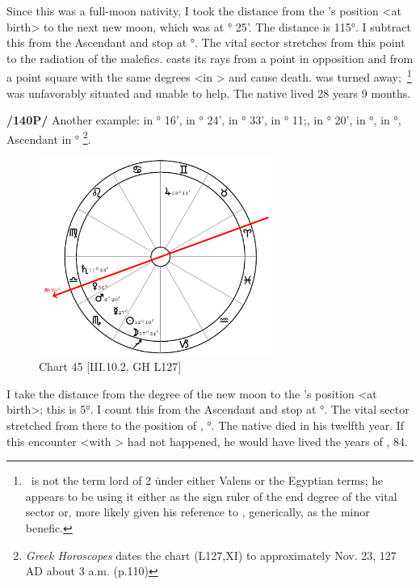 Since this was a full-moon nativity, I took the distance from the \Moon’s position <at birth> to the next new moon, which was at \Gemini\xspace 2° 25'. The distance is 115°. I subtract this from the Ascendant and stop at \Libra\xspace 2°. The vital sector stretches from this point to the radiation of the malefics. \Saturn\xspace casts its rays from a point in opposition and \Mars\xspace from a point square with the same degrees <in \Libra> and cause death. \Jupiter\xspace was turned away; \Venus\,\footnote{\Venus\, is not the term lord of 2 \Libra\. under either Valens or the Egyptian terms; he appears to be using it either as the sign ruler of the end degree of the vital sector or, more likely given his reference to \Jupiter, generically, as the minor benefic.} was unfavorably situated and unable to help. The native lived 28 years 9 months.

\newpage
\textbf{/140P/} Another example: \Sun\xspace in \Sagittarius\xspace 12° 16', \Moon\xspace in \Sagittarius\xspace 17° 24', \Saturn\xspace in \Libra\xspace 11° 33', \Jupiter\xspace in \Gemini\xspace 19° 11;, \Mars\xspace in \Scorpio\xspace 4° 20', \Venus\xspace in \Libra\xspace 26°, \Mercury\xspace in \Scorpio\xspace 27°,
Ascendant in \Libra\xspace 20°
\footnote{\textit{Greek Horoscopes} dates the chart (L127,XI) to approximately Nov. 23, 127 AD about 3 a.m. (p.110)}.

\clearpage
\begin{figure}
\centering
\vspace{-20pt}
\includegraphics[width=0.68\textwidth]{charts/3_10_2}
\caption{Chart 45 [III.10.2, GH L127]}
\label{fig:chart45}
\end{figure} 


I take the distance from the degree of the new moon to the \Moon’s position <at birth>; this is 5°. I count this from the Ascendant and stop at \Libra\xspace 25°. The vital sector stretched from there to the position of \Mars, \Scorpio\xspace 5°. The native died in his twelfth year. If this encounter <with \Mars> had not happened, he would have lived the years of \Venus, 84.

\newpage
